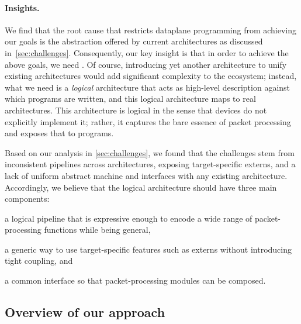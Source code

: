 \documentclass[letterpaper,twocolumn,10pt]{article}
\begin{document}
\paragraph{Insights.}
We find that the root cause that restricts dataplane programming from
achieving our goals is the abstraction offered by current
architectures as discussed in~\cref{sec:challenges}.  Consequently,
our key insight is that in order to achieve the above goals, we need
. Of course, introducing yet another architecture to unify
existing architectures would add significant complexity to the
ecosystem; instead, what we need is a \emph{logical} architecture that
acts as high-level description against which programs are written, and
this logical architecture maps to real architectures. This
architecture is logical in the sense that devices do not explicitly
implement it; rather, it captures the bare essence of packet
processing and exposes that to programs.

Based on our analysis in \cref{sec:challenges}, we found that the
challenges stem from inconsistent pipelines across architectures,
exposing target-specific externs, and a lack of uniform abstract
machine and interfaces with any existing architecture. Accordingly, we
believe that the logical architecture should have three main
components:
\begin{enumerate*}[label=(\roman*)]
  \item a logical pipeline that is expressive enough to encode a
    wide range of packet-processing functions while being general,
  \item a generic way to use target-specific features such as externs
    without introducing tight coupling, and
  \item a common interface so that packet-processing modules can be
    composed.
\end{enumerate*}


\subsection{Overview of our approach}
\label{sec:overview}
\end{document}
